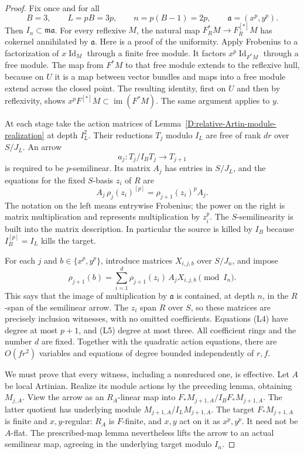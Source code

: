 \begin{proof}
Fix once and for all
\[
 B=3,\qquad L=pB=3p,\qquad n=p(B-1)=2p,\qquad
 \mathfrak a=(x^p,y^p).
 \tag{L3}
\]
Then \(I_n\subset\mathfrak m\mathfrak a\).
For every reflexive \(M\), the natural map
\(F_R^*M\to F_R^{[*]}M\) has cokernel annihilated by \(\mathfrak a\).
Here is a proof of the uniformity. Apply Frobenius to a factorization
of \(x\operatorname{Id}_M\) through a finite free module.
It factors \(x^p\operatorname{Id}_{F^*M}\) through a free module.
The map from \(F^*M\) to that free module extends to the reflexive hull,
because on \(U\) it is a map between vector bundles and maps into
a free module extend across the closed point. The resulting identity,
first on \(U\) and then by reflexivity, shows
\(x^pF^{[*]}M\subset\operatorname{im}(F^*M)\).
The same argument applies to \(y\).

At each stage take the action matrices of
Lemma~\ref{D:relative-Artin-module-realization} at depth \(I_L^2\).
Their reductions \(T_j\) modulo \(I_L\) are free of rank \(dr\) over
\(S/J_L\).
An arrow
\[
 a_j:T_j/I_BT_j\longrightarrow T_{j+1}
\]
is required to be \(p\)-semilinear. Its matrix \(A_j\) has entries
in \(S/J_L\), and the equations for the fixed \(S\)-basis \(z_i\)
of \(R\) are
\[
 A_j\,\rho_j(z_i)^{[p]}=\rho_{j+1}(z_i)^p A_j.
 \tag{L4}
\]
The notation on the left means entrywise Frobenius; the power on
the right is matrix multiplication and represents multiplication
by \(z_i^p\). The \(S\)-semilinearity is built into the matrix
description. In particular the source is killed by \(I_B\) because
\(I_B^{[p]}=I_L\) kills the target.

For each \(j\) and \(b\in\{x^p,y^p\}\), introduce matrices
\(X_{i,j,b}\) over \(S/J_n\), and impose
\[
 \rho_{j+1}(b)=
   \sum_{i=1}^d \rho_{j+1}(z_i)\,A_jX_{i,j,b}
       \pmod {I_n}.
 \tag{L5}
\]
This says that the image of multiplication by \(\mathfrak a\)
is contained, at depth \(n\), in the \(R\)-span of the semilinear
arrow. The \(z_i\) span \(R\) over \(S\), so these matrices are
precisely inclusion witnesses, with no omitted coefficients.
Equations (L4) have degree at most \(p+1\), and (L5) degree at
most three. All coefficient rings and the number \(d\) are fixed.
Together with the quadratic action equations, there are
\(O(fr^2)\) variables and equations of degree bounded independently
of \(r,f\).

We must prove that every witness, including a nonreduced one, is
effective. Let \(A\) be local Artinian.
Realize its module actions by the preceding lemma, obtaining
\(M_{j,A}\). View the arrow as an \(R_A\)-linear map into
\(F_*M_{j+1,A}/I_BF_*M_{j+1,A}\).
The latter quotient has underlying module \(M_{j+1,A}/I_LM_{j+1,A}\).
The target \(F_*M_{j+1,A}\) is finite and \(x,y\)-regular:
\(R_A\) is \(F\)-finite, and \(x,y\) act on it as \(x^p,y^p\).
It need not be \(A\)-flat. The prescribed-map lemma nevertheless
lifts the arrow to an actual semilinear map, agreeing in the
underlying target modulo \(I_n\).


\end{proof}
